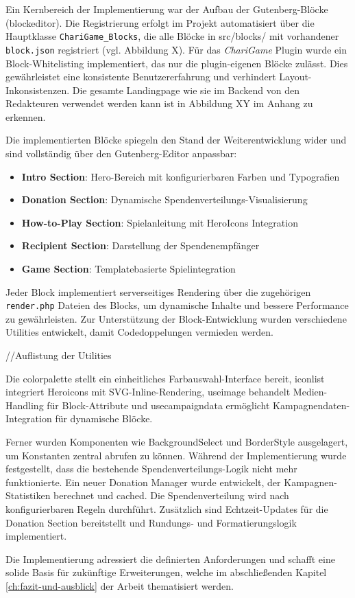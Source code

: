Ein Kernbereich der Implementierung war der Aufbau der Gutenberg-Blöcke (\gls{blockeditor}).
Die Registrierung erfolgt im Projekt automatisiert über die Hauptklasse \texttt{ChariGame\_Blocks}, die alle Blöcke in src/blocks/ mit vorhandener \texttt{block.json} registriert (vgl. Abbildung X). %
Für das \textit{ChariGame} Plugin wurde ein Block-Whitelisting implementiert, das nur die plugin-eigenen Blöcke zulässt.
Dies gewährleistet eine konsistente Benutzererfahrung und verhindert Layout-Inkonsistenzen.
Die gesamte Landingpage wie sie im Backend von den Redakteuren verwendet werden kann ist in Abbildung XY im Anhang zu erkennen. %

Die implementierten Blöcke spiegeln den Stand der Weiterentwicklung wider und sind vollständig über den Gutenberg-Editor anpassbar:

\begin{itemize}
    \item \textbf{Intro Section}: Hero-Bereich mit konfigurierbaren Farben und Typografien
    \item \textbf{Donation Section}: Dynamische Spendenverteilungs-Visualisierung
    \item \textbf{How-to-Play Section}: Spielanleitung mit HeroIcons Integration
    \item \textbf{Recipient Section}: Darstellung der Spendenempfänger
    \item \textbf{Game Section}: Templatebasierte Spielintegration
\end{itemize}

Jeder Block implementiert serverseitiges Rendering über die zugehörigen \texttt{render.php} Dateien des Blocks, um dynamische Inhalte und bessere Performance zu gewährleisten.
Zur Unterstützung der Block-Entwicklung wurden verschiedene Utilities entwickelt, damit Codedoppelungen vermieden werden.


//Auflistung der Utilities

Die colorpalette stellt ein einheitliches Farbauswahl-Interface bereit, iconlist integriert Heroicons mit SVG-Inline-Rendering, useimage behandelt Medien-Handling für Block-Attribute und usecampaigndata ermöglicht Kampagnendaten-Integration für dynamische Blöcke.

Ferner wurden Komponenten wie BackgroundSelect und BorderStyle ausgelagert, um Konstanten zentral abrufen zu können.
Während der Implementierung wurde festgestellt, dass die bestehende Spendenverteilungs-Logik nicht mehr funktionierte.
Ein neuer Donation Manager wurde entwickelt, der Kampagnen-Statistiken berechnet und cached.
Die Spendenverteilung wird nach konfigurierbaren Regeln durchführt.
Zusätzlich sind Echtzeit-Updates für die Donation Section bereitstellt und Rundungs- und Formatierungslogik implementiert.

Die Implementierung adressiert die definierten Anforderungen und schafft eine solide Basis für zukünftige Erweiterungen, welche im abschließenden Kapitel \ref{ch:fazit-und-ausblick} der Arbeit thematisiert werden.
